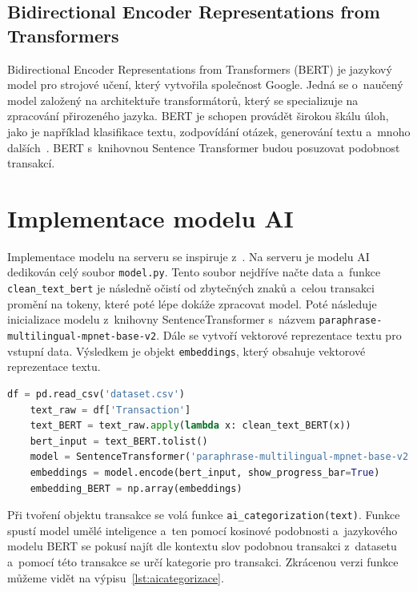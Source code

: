 \subsection{Bidirectional Encoder Representations from Transformers}

Bidirectional Encoder Representations from Transformers (BERT) je jazykový model pro strojové učení, který vytvořila společnost Google. Jedná se o~naučený model založený na architektuře transformátorů, který se specializuje na zpracování přirozeného jazyka. BERT je schopen provádět širokou škálu úloh, jako je například klasifikace textu, zodpovídání otázek, generování textu a~mnoho dalších~\cite{bertcitace}.
BERT s~knihovnou Sentence Transformer budou posuzovat podobnost transakcí.

\section{Implementace modelu AI}
Implementace modelu na serveru se inspiruje z~\cite{cuicategorize}.
Na serveru je modelu AI dedikován celý soubor \texttt{model.py}. Tento soubor nejdříve načte data a~funkce \texttt{clean\_text\_bert} je následně očistí od zbytečných znaků a~celou transakci promění na tokeny, které poté lépe dokáže zpracovat model.
Poté následuje inicializace modelu z~knihovny SentenceTransformer s~názvem \texttt{paraphrase-multilingual-mpnet-base-v2}. Dále se vytvoří vektorové reprezentace textu pro vstupní data. Výsledkem je objekt \texttt{embeddings}, který obsahuje vektorové reprezentace textu. 
\begin{lstlisting}[language=python,caption={\texttt{model.py}.},label={lst:modelpy},breaklines=true]
    df = pd.read_csv('dataset.csv')
    text_raw = df['Transaction']
    text_BERT = text_raw.apply(lambda x: clean_text_BERT(x))
    bert_input = text_BERT.tolist()
    model = SentenceTransformer('paraphrase-multilingual-mpnet-base-v2')
    embeddings = model.encode(bert_input, show_progress_bar=True)
    embedding_BERT = np.array(embeddings)
\end{lstlisting}
Při tvoření objektu transakce se volá funkce \texttt{ai\_categorization(text)}. Funkce spustí model umělé inteligence a~ten pomocí kosinové podobnosti a~jazykového modelu BERT se pokusí najít dle kontextu slov podobnou transakci z~datasetu a~pomocí této transakce se určí kategorie pro transakci. Zkrácenou verzi funkce můžeme vidět na výpisu~\ref{lst:aicategorizace}.
